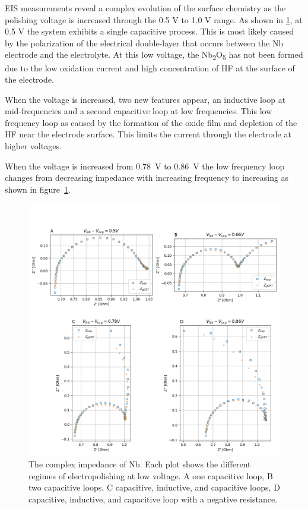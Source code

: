 \documentclass{revtex4-2}
\begin{document}
EIS measurements reveal a complex evolution of the surface chemistry as the polishing voltage is increased through the 0.5 V to 1.0 V range. As shown in \ref{fig:nyquistplot}, at 0.5 V the system exhibits a single capacitive process. This is most likely caused by the polarization of the electrical double-layer that occurs between the Nb electrode and the electrolyte. At this low voltage, the Nb\textsubscript{2}O\textsubscript{5} has not been formed due to the low oxidation current and high concentration of HF at the surface of the electrode.

When the voltage is increased, two new features appear, an inductive loop at mid-frequencies and a second capacitive loop at low frequencies. This low frequency loop as caused by the formation of the oxide film and depletion of the HF near the electrode surface. This limits the current through the electrode at higher voltages. 

When the voltage is increased from \qty{0.78}{\volt} to \qty{0.86}{\volt} the low frequency loop changes from decreasing impedance with increasing frequency to increasing as shown in figure~\ref{fig:nyquistplot}.

\begin{figure}[t]
  \label{fig:nyquistplot}
  \includegraphics[width=\textwidth]{../figures/nyquist.png}
  \caption{The complex impedance of Nb. Each plot shows the different regimes of electropolishing at low voltage. A one capacitive loop, B two capacitive loops, C capacitive, inductive, and capacitive loops, D capacitive, inductive, and capacitive loop with a negative resistance.}
\end{figure}
\end{document}
